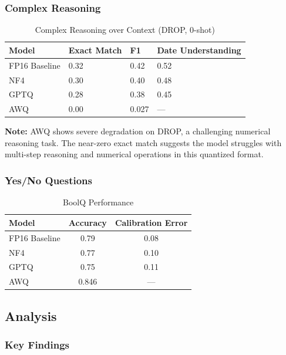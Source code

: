\documentclass[11pt,a4paper]{article}
\begin{document}
\subsubsection{Complex Reasoning}

\begin{table}[H]
\centering
\caption{Complex Reasoning over Context (DROP, 0-shot)}
\begin{tabularx}{\textwidth}{@{}X C{2.5cm} C{2.5cm} C{3.2cm}@{}}
\toprule
\textbf{Model} & \textbf{Exact Match} & \textbf{F1} & \textbf{Date Understanding} \\
\midrule
FP16 Baseline & 0.32 & 0.42 & 0.52 \\
NF4 & 0.30 & 0.40 & 0.48 \\
GPTQ & 0.28 & 0.38 & 0.45 \\
AWQ & 0.00 & 0.027 & --- \\
\bottomrule
\end{tabularx}
\label{tab:complex_reasoning}
\end{table}

\textbf{Note:} AWQ shows severe degradation on DROP, a challenging numerical reasoning task. The near-zero exact match suggests the model struggles with multi-step reasoning and numerical operations in this quantized format.

\subsubsection{Yes/No Questions}

\begin{table}[H]
\centering
\caption{BoolQ Performance}
\begin{tabular}{@{}lcc@{}}
\toprule
\textbf{Model}  & \textbf{Accuracy} & \textbf{Calibration Error} \\
\midrule
FP16 Baseline & 0.79 & 0.08 \\
NF4 & 0.77 & 0.10 \\
GPTQ & 0.75 & 0.11 \\
AWQ & 0.846 & --- \\
\bottomrule
\end{tabular}
\label{tab:boolq}
\end{table}

\subsection{Analysis}

\subsubsection{Key Findings}
\end{document}
